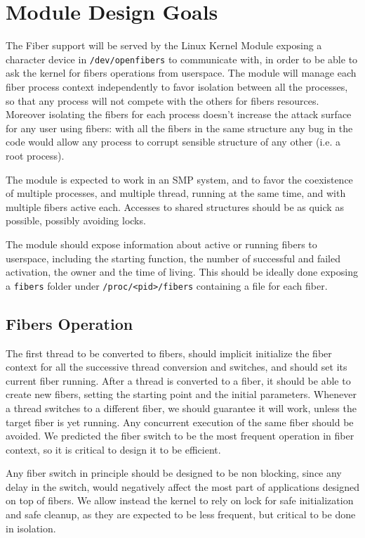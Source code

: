 \documentclass[11pt]{article}
\begin{document}
\section{Module Design Goals}
The Fiber support will be served by the Linux Kernel Module exposing a character device in \texttt{/dev/openfibers} to communicate with, in order to be able to ask the kernel for fibers operations from userspace. The module will manage each fiber process context independently to favor isolation between all the processes, so that any process will not compete with the others for fibers resources. Moreover isolating the fibers for each process doesn't increase the attack surface for any user using fibers: with all the fibers in the same structure any bug in the code would allow any process to corrupt sensible structure of any other (i.e. a root process).

The module is expected to work in an SMP system, and to favor the coexistence of multiple processes, and multiple thread, running at the same time, and with multiple fibers active each. Accesses to shared structures should be as quick as possible, possibly avoiding locks.

The module should expose information about active or running fibers to userspace, including the starting function, the number of successful and failed activation, the owner and the time of living. This should be ideally done exposing a {\tt fibers} folder under {\tt /proc/<pid>/fibers} containing a file for each fiber.

\subsection{Fibers Operation}
The first thread to be converted to fibers, should implicit initialize the fiber context for all the successive thread conversion and switches, and should set its current fiber running. After a thread is converted to a fiber, it should be able to create new fibers, setting the starting point and the initial parameters. Whenever a thread switches to a different fiber, we should guarantee it will work, unless the target fiber is yet running. Any concurrent execution of the same fiber should be avoided. We predicted the fiber switch to be the most frequent operation in fiber context, so it is critical to design it to be efficient.

Any fiber switch in principle should be designed to be non blocking, since any delay in the switch, would negatively affect the most part of applications designed on top of fibers. We allow instead the kernel to rely on lock for safe initialization and safe cleanup, as they are expected to be less frequent, but critical to be done in isolation.
\end{document}

